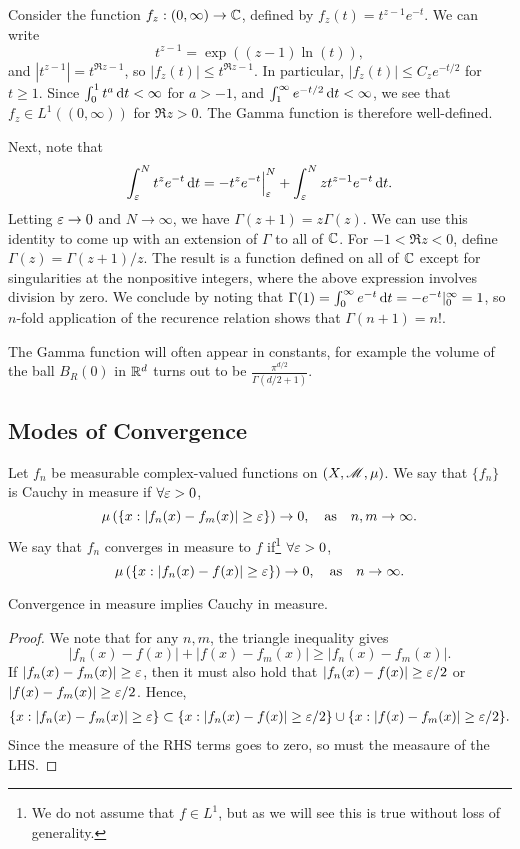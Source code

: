 \documentclass[12pt]{article} %
\begin{document}
\noindent Consider the function $f_z : (0, \infty) \to \mathbb{C}$, defined by $f_z(t) = t^{z-1}e^{-t}$. We can write \[t^{z-1} = \exp((z-1)\ln(t)),\] and $|t^{z-1}| = t^{\Re z - 1}$, so $|f_z(t)| \leq t^{\Re z - 1}$. In particular, $|f_z(t)| \leq C_z e^{-t/2}$ for $t \geq 1$. Since $\int_0^1 t^a \, \mathrm{d} t < \infty$ for $a > -1$, and $\int_1^\infty e^{-t/2} \, \mathrm{d} t < \infty$, we see that $f_z \in L^1((0, \infty))$ for $\Re z > 0$. The Gamma function is therefore well-defined.

Next, note that \[\int_\varepsilon^N t^z e^{-t} \, \mathrm{d} t = -t^z e^{-t} \Big|_\varepsilon^N + \int_\varepsilon^N z t^{z-1} e^{-t} \, \mathrm{d} t.\] Letting $\varepsilon \to 0$ and $N \to \infty$, we have $\Gamma(z+1) = z\Gamma(z)$. We can use this identity to come up with an extension of $\Gamma$ to all of $\mathbb{C}$. For $-1 < \Re z < 0$, define $\Gamma(z) = \Gamma(z+1) / z$. The result is a function defined on all of $\mathbb{C}$ except for singularities at the nonpositive integers, where the above expression involves division by zero. We conclude by noting that $\Gamma(1) = \int_0^\infty e^{-t} \, \mathrm{d} t = -e^{-t} |_0^\infty = 1$, so $n$-fold application of the recurence relation shows that $\Gamma(n+1) = n!$.

The Gamma function will often appear in constants, for example the volume of the ball $B_R(0)$ in $\mathbb{R}^d$ turns out to be $\frac{\pi^{d/2}}{\Gamma(d/2 + 1)}$.

\subsection{Modes of Convergence}

\begin{definition}
    Let $f_n$ be measurable complex-valued functions on $(X, \mathscr{M}, \mu)$. We say that $\{f_n\}$ is Cauchy in measure if $\forall \varepsilon > 0$, \[\mu\left(\{x : |f_n(x) - f_m(x)| \geq \varepsilon\}\right) \to 0, \ \ \ \text{as} \ \ \ n,m \to \infty.\] We say that $f_n$ converges in measure to $f$ if\footnote{We do not assume that $f \in L^1$, but as we will see this is true without loss of generality.} $\forall \varepsilon > 0$, \[\mu\left(\{x : |f_n(x) - f(x)| \geq \varepsilon\}\right) \to 0, \ \ \ \text{as} \ \ \ n \to \infty.\]
\end{definition}

\begin{proposition}
    Convergence in measure implies Cauchy in measure.
\end{proposition}

\begin{proof}
    We note that for any $n, m$, the triangle inequality gives \[|f_n(x) - f(x)| + |f(x) - f_m(x)| \geq |f_n(x) - f_m(x)|.\] If $|f_n(x) - f_m(x)| \geq \varepsilon$, then it must also hold that $|f_n(x) - f(x)| \geq \varepsilon / 2$ or $|f(x) - f_m(x)| \geq \varepsilon / 2$. Hence, \begin{align*}
        \{x : |f_n(x) - f_m(x)| \geq \varepsilon\} \subset \{x : |f_n(x) - f(x)| \geq \varepsilon/2\} \cup \{x : |f(x) - f_m(x)| \geq \varepsilon/2\}.
    \end{align*}
    Since the measure of the RHS terms goes to zero, so must the measaure of the LHS.
\end{proof}
\end{document}
